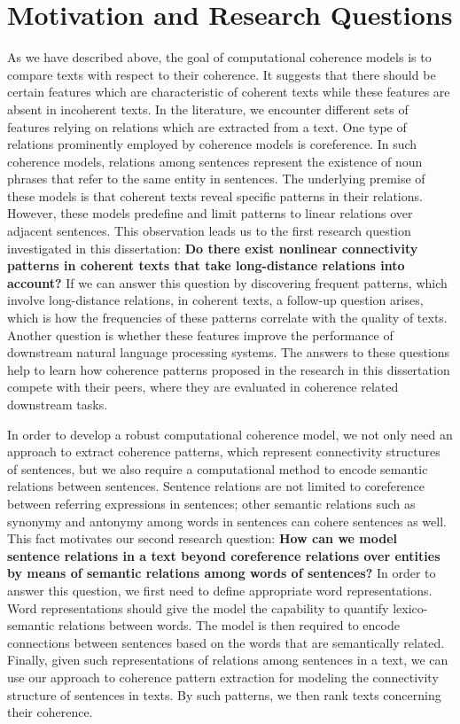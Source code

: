 \section{Motivation and Research Questions}
\label{sec:intro-motivation}

As we have described above, the goal of computational coherence models is to compare texts with respect to their coherence. 
It suggests that there should be certain features which are characteristic of coherent texts while these features are absent in incoherent texts. 
In the literature, we encounter different sets of features relying on relations which are extracted from a text. 
One type of relations prominently employed by coherence models is coreference. 
In such coherence models, relations among sentences represent the existence of noun phrases that refer to the same entity in sentences. 
The underlying premise of these models is that coherent texts reveal specific patterns in their relations. 
However, these models predefine and limit patterns to linear relations over adjacent sentences. 
This observation leads us to the first research question investigated in this dissertation: 
\textbf{Do there exist nonlinear connectivity patterns in coherent texts that take long-distance relations into account?} 
If we can answer this question by discovering frequent patterns, which involve long-distance relations, in coherent texts, a follow-up question arises, which is how the frequencies of these patterns correlate with the quality of texts. 
Another question is whether these features improve the performance of downstream natural language processing systems.  
The answers to these questions help to learn how coherence patterns proposed in the research in this dissertation compete with their peers, where they are evaluated in coherence related downstream tasks. 

In order to develop a robust computational coherence model, we not only need an approach to extract coherence patterns, which represent connectivity structures of sentences, but we also require a computational method to encode semantic relations between sentences. 
Sentence relations are not limited to coreference between referring expressions in sentences; other semantic relations such as synonymy and antonymy among words in sentences can cohere sentences as well. 
This fact motivates our second research question: 
\textbf{How can we model sentence relations in a text beyond coreference relations over entities by means of semantic relations among words of sentences?} 
In order to answer this question, we first need to define appropriate word representations.  
Word representations should give the model the capability to quantify lexico-semantic relations between words. 
The model is then required to encode connections between sentences based on the words that are semantically related. 
Finally, given such representations of relations among sentences in a text, we can use our approach to coherence pattern extraction for modeling the connectivity structure of sentences in texts.
By such patterns, we then rank texts concerning their coherence. 

